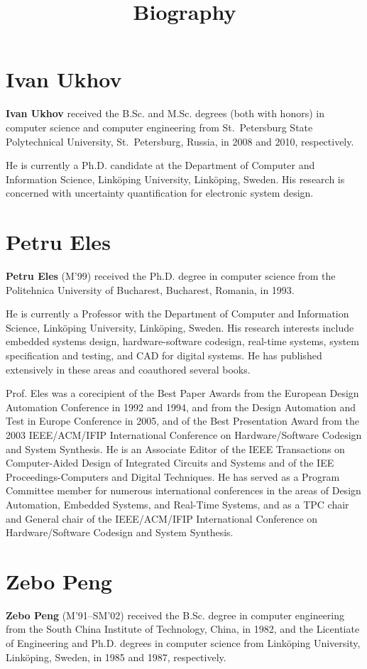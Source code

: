 \documentclass[conference]{IEEEtran}
\title{Biography}
\author{}
\begin{document}
  \maketitle

  \section*{Ivan Ukhov}
  {\bf Ivan Ukhov} received the B.Sc. and M.Sc. degrees (both with honors) in computer science and computer engineering from St.~Petersburg State Polytechnical University, St.~Petersburg, Russia, in 2008 and 2010, respectively.

  He is currently a Ph.D. candidate at the Department of Computer and Information Science, Link\"{o}ping University, Link\"{o}ping, Sweden.
  His research is concerned with uncertainty quantification for electronic system design.

  \section*{Petru Eles}
  {\bf Petru Eles} (M'99) received the Ph.D. degree in computer science from the Politehnica University of Bucharest, Bucharest, Romania, in 1993.

  He is currently a Professor with the Department of Computer and Information Science, Link\"{o}ping University, Link\"{o}ping, Sweden.
  His research interests include embedded systems design, hardware-software codesign, real-time systems, system specification and testing, and CAD for digital systems.
  He has published extensively in these areas and coauthored several books.

  Prof. Eles was a corecipient of the Best Paper Awards from the European Design Automation Conference in 1992 and 1994, and from the Design Automation and Test in Europe Conference in 2005, and of the Best Presentation Award from the 2003 IEEE/ACM/IFIP International Conference on Hardware/Software Codesign and System Synthesis.
  He is an Associate Editor of the IEEE Transactions on Computer-Aided Design of Integrated Circuits and Systems and of the IEE Proceedings-Computers and Digital Techniques.
  He has served as a Program Committee member for numerous international conferences in the areas of Design Automation, Embedded Systems, and Real-Time Systems, and as a TPC chair and General chair of the IEEE/ACM/IFIP International Conference on Hardware/Software Codesign and System Synthesis.

  \section*{Zebo Peng}
  {\bf Zebo Peng} (M'91--SM'02) received the B.Sc. degree in computer engineering from the South China Institute of Technology, China, in 1982, and the Licentiate of Engineering and Ph.D. degrees in computer science from Link\"{o}ping University, Link\"{o}ping, Sweden, in 1985 and 1987, respectively.
\end{document}
